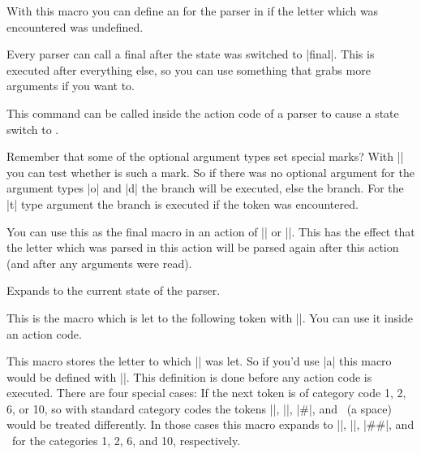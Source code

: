 \begin{command}{\pgfparserdefunknown{}}%
  With this macro you can define an  for the 
  parser in  if the letter which was encountered was undefined.
\end{command}%

\begin{command}{\pgfparserdeffinal{}}%
  Every parser can call a final  after the state was switched to
  |final|. This  is executed after everything else, so you can use
  something that grabs more arguments if you want to.
\end{command}%

\begin{command}{\pgfparserswitch{}}%
  This command can be called inside the action code of a parser to cause a
  state switch to .
\end{command}%

\begin{command}{\pgfparserifmark{}}%
  Remember that some of the optional argument types set special marks? With
  |\pgfparserifmark| you can test whether  is such a mark. So if
  there was no optional argument for the argument types |o| and |d| the
   branch will be executed, else the  branch. For the |t|
  type argument the  branch is executed if the token was encountered.
\end{command}%

\begin{command}{\pgfparserreinsert}%
  You can use this as the final macro in an action of |\pgfparserdef| or
  |\pgfparserdefunknown|. This has the effect that the letter which was parsed
  in this action will be parsed again after this action (and after any arguments
  were read).
\end{command}%

\begin{command}{\pgfparserstate}%
  Expands to the current state of the parser.
\end{command}%

\begin{command}{\pgfparsertoken}%
  This is the macro which is let to the following token with |\futurelet|. You
  can use it inside an action code.
\end{command}%

\begin{command}{\pgfparserletter}%
  This macro stores the letter to which |\pgfparsertoken| was let. So if
  you'd use |a| this macro would be defined with
  |\def\pgfparserletter{a}|. This definition is done before any action code is
  executed. There are four special cases: If the next token is of category code
  1, 2, 6, or 10, so with standard category codes the tokens |{|, |}|, |#|, and
  \textvisiblespace\ (a space) would be treated differently. In those cases this
  macro expands to |\bgroup|, |\egroup|, |##|, and \textvisiblespace\ for the
  categories 1, 2, 6, and 10, respectively.
\end{command}%

